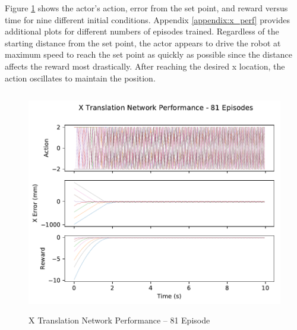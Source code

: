 Figure \ref{fig:x_perf81} shows the actor's action, error from the set point, and reward versus time for nine different initial conditions. Appendix \ref{appendix:x_perf} provides additional plots for different numbers of episodes trained. Regardless of the starting distance from the set point, the actor appears to drive the robot at maximum speed to reach the set point as quickly as possible since the distance affects the reward most drastically. After reaching the desired x location, the action oscillates to maintain the position.
\begin{figure}[H]
	\centering
	\includegraphics[width=6in, height=3.85in, keepaspectratio]{figures/train_figs/transx_transitions/1_81.pdf}
	\caption{X Translation Network Performance -- 81 Episode}\label{fig:x_perf81}
\end{figure}

